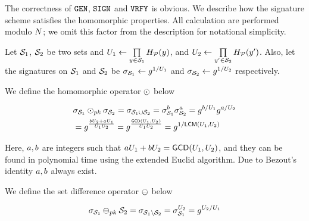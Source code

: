 %
The correctness of $\keyGen$, $\signingAlg$ and $\verify$ is obvious. We describe how the signature scheme satisfies the homomorphic properties. All calculation are performed modulo $N$; we omit this factor from the description for notational simplicity. 

Let  $\genericSetVar[1]$, $\genericSetVar[2]$ be two sets and $\accSet[1] \gets 
\prod\limits_{\genericCInputElmt \in \genericSetVar[1]} \primeRO(\genericCInputElmt)$, and $\accSet[2] \gets 
\prod\limits_{\genericCInputElmt' \in \genericSetVar[2]}  \primeRO(\genericCInputElmt')$. Also, let the signatures on $\genericSetVar[1]$ and $\genericSetVar[2]$ be $\genericSig[\genericSetVar[1]] \assign \qrGen^{1/\accSet[1]}$ and $\genericSig[\genericSetVar[2]] \assign \qrGen^{1/\accSet[2]}$ respectively. %


\itemListStart
\item {} We define the homomorphic operator $\sigHomomorphism$ below


\begin{align*}
& \genericSig[\genericSetVar[1]] \sigHomomorphism[\pubKey] \genericSig[\genericSetVar[2]] = \genericSig[\genericSetVar[1] \cup \genericSetVar[2]] = 
\genericSig[\genericSetVar[1]]^{\euclideanConst[2]}  \genericSig[\genericSetVar[2]]^{\euclideanConst[1]} = \qrGen^{\euclideanConst[2]/\accSet[1]} \qrGen^{\euclideanConst[1]/\accSet[2]} \\
&  = \qrGen^{\frac{\euclideanConst[2] \accSet[2] + \euclideanConst[1] \accSet[1]}{\accSet[1] \accSet[2]}} =\qrGen^{\frac{\gcd(\accSet[1], \accSet[2])}{\accSet[1] \accSet[2]}} = \qrGen^{1/\lcm(\accSet[1], \accSet[2])} \label{eq}
\end{align*}


Here, $\euclideanConst[1], \euclideanConst[2]$ are integers such that $\euclideanConst[1]\accSet[1] + \euclideanConst[2] \accSet[2] = \gcd(\accSet[1], \accSet[2])$, and they can be found in polynomial time using the extended Euclid algorithm. Due to Bezout's identity $\euclideanConst[1], \euclideanConst[2]$ always exist. 






\item {} We define the set difference operator $\sigMinus$ below

\[
\genericSig[\genericSetVar[1]] \sigMinus[\pubKey] \genericSetVar[2] = \genericSig[\genericSetVar[1] \setminus \genericSetVar[2]] = \genericSig[\genericSetVar[1]]^{\accSet[2]} = \qrGen^{\accSet[2]/\accSet[1]}
\]

